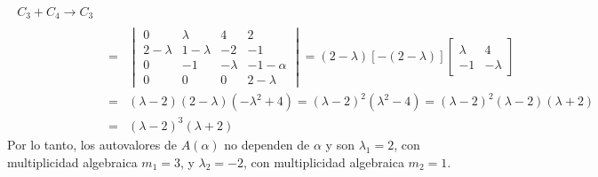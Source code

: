 \begin{solucion}
\begin{enumerate}[$a$)]
\begin{eqnarray*}
\begin{matrix}
    C_3 + C_4 \to C_3
   \end{matrix}
   \\
   & = & 
   \begin{vmatrix}
    0 & \lambda & 4 & 2 \\
    2 - \lambda & 1 - \lambda & -2 & -1 \\
    0 & -1 & -\lambda & -1-\alpha \\
    0 & 0 & 0 & 2-\lambda
   \end{vmatrix}
   =
   (2-\lambda)[-(2-\lambda)]
   \begin{bmatrix}
    \lambda & 4 \\
    -1 & -\lambda
   \end{bmatrix}
   \\
   & = & 
   (\lambda-2)(2-\lambda)( -\lambda^2 + 4 ) = (\lambda-2)^2(\lambda^2 - 4) 
   = (\lambda-2)^2(\lambda-2)(\lambda+2)
   \\
   & = & (\lambda-2)^3(\lambda+2)
  \end{eqnarray*}
  Por lo tanto, los autovalores de $A(\alpha)$ no dependen de $\alpha$ y son $\lambda_1 = 2$, con multiplicidad algebraica $m_1 = 3$, y $\lambda_2 = -2$, con multiplicidad algebraica $m_2 = 1$.
  

\end{enumerate}
\end{solucion}

